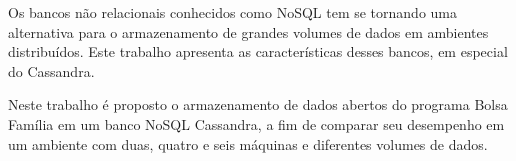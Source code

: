 Os bancos não relacionais conhecidos como NoSQL tem se tornando uma alternativa para o armazenamento de grandes volumes de dados em ambientes distribuídos. Este trabalho apresenta as características desses bancos, em especial do Cassandra.

Neste trabalho é proposto o armazenamento de dados abertos do programa Bolsa Família em um banco NoSQL Cassandra, a fim de comparar seu desempenho em um ambiente com duas, quatro e seis máquinas e diferentes volumes de dados. 